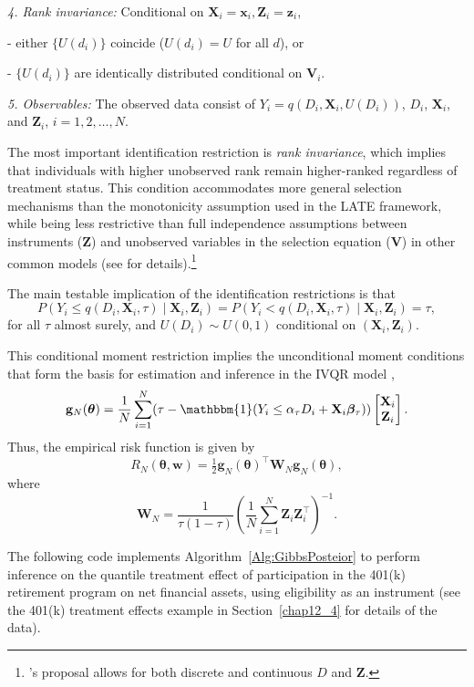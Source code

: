 \textit{4. Rank invariance:} Conditional on $\mathbf{X}_i=\mathbf{x}_i,\mathbf{Z}_i=\mathbf{z}_i$,

- either $\{U(d_i)\}$ coincide ($U(d_i)=U$ for all $d$), or
  
- $\{U(d_i)\}$ are identically distributed conditional on $\mathbf{V}_i$.  

\textit{5. Observables:} The observed data consist of $Y_i=q(D_i,\mathbf{X}_i,U(D_i))$, $D_i$, $\mathbf{X}_i$, and $\mathbf{Z}_i$, $i=1,2,\dots,N$.  

The most important identification restriction is \textit{rank invariance}, which implies that individuals with higher unobserved rank remain higher-ranked regardless of treatment status. This condition accommodates more general selection mechanisms than the monotonicity assumption used in the LATE framework, while being less restrictive than full independence assumptions between instruments ($\mathbf{Z}$) and unobserved variables in the selection equation ($\mathbf{V}$) in other common models (see \cite{chernozhukov2004effects,Chernozhukov2005} for details).\footnote{\cite{Chernozhukov2005}'s proposal allows for both discrete and continuous $D$ and $\mathbf{Z}$.} 

The main testable implication of the identification restrictions is that
\[
P\!\left(Y_i \leq q(D_i,\mathbf{X}_i,\tau)\mid \mathbf{X}_i,\mathbf{Z}_i\right)
= P\!\left(Y_i < q(D_i,\mathbf{X}_i,\tau)\mid \mathbf{X}_i,\mathbf{Z}_i\right)
= \tau,
\]
for all $\tau$ almost surely, and $U(D_i)\sim U(0,1)$ conditional on $(\mathbf{X}_i,\mathbf{Z}_i)$.  

This conditional moment restriction implies the unconditional moment conditions that form the basis for estimation and inference in the IVQR model \cite{chernozhukov2003mcmc,chernozhukov2004effects},
\[
\mathbf{g}_N(\boldsymbol{\theta})=\frac{1}{N}\sum_{i=1}^N (\tau-\mathbbm{1}(Y_i\leq \alpha_{\tau}D_i+\mathbf{X}_i\boldsymbol{\beta}_{\tau}))\begin{bmatrix}
\mathbf{X}_i\\
\mathbf{Z}_i
\end{bmatrix}.
\]
Thus, the empirical risk function is given by 
\[
R_N(\boldsymbol{\theta},\mathbf{w})=\tfrac{1}{2}\mathbf{g}_N(\boldsymbol{\theta})^{\top}\mathbf{W}_N\mathbf{g}_N(\boldsymbol{\theta}),
\]
where
\[
\mathbf{W}_N=\frac{1}{\tau(1-\tau)}\left(\frac{1}{N}\sum_{i=1}^N \mathbf{Z}_i\mathbf{Z}_i^{\top}\right)^{-1}.
\]

The following code implements Algorithm~\ref{Alg:GibbsPosteior} to perform inference on the quantile treatment effect of participation in the 401(k) retirement program on net financial assets, using eligibility as an instrument (see the 401(k) treatment effects example in Section~\ref{chap12_4} for details of the data).

